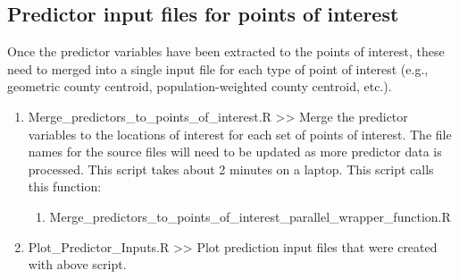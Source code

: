 \subsection{Predictor input files for points of interest}

Once the predictor variables have been extracted to the points of interest, these need to merged into a single input file for each type of point of interest (e.g., geometric county centroid, population-weighted county centroid, etc.).

\begin{enumerate}
\item Merge\_predictors\_to\_points\_of\_interest.R >> Merge the predictor variables to the locations of interest for each set of points of interest. The file names for the source files will need to be updated as more predictor data is processed. This script takes about 2 minutes on a laptop. This script calls this function:

	\begin{enumerate}
	\item Merge\_predictors\_to\_points\_of\_interest\_parallel\_wrapper\_function.R
	\end{enumerate}

\item Plot\_Predictor\_Inputs.R >> Plot prediction input files that were created with above script. 

\end{enumerate}